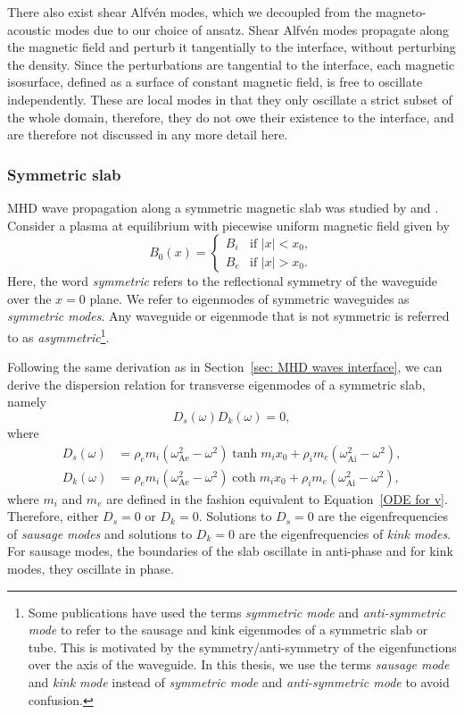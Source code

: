 There also exist shear Alfv\'{e}n modes, which we decoupled from the magneto-acoustic modes due to our choice of ansatz. Shear Alfv\'{e}n modes propagate along the magnetic field and perturb it tangentially to the interface, without perturbing the density. Since the perturbations are tangential to the interface, each magnetic isosurface, defined as a surface of constant magnetic field, is free to oscillate independently. These are local modes in that they only oscillate a strict subset of the whole domain, therefore, they do not owe their existence to the interface, and are therefore not discussed in any more detail here.


\subsubsection{Symmetric slab} \label{sec: MHD waves sym slab}

MHD wave propagation along a symmetric magnetic slab was studied by \cite{rob81b} and \cite{edw_etal82}. Consider a plasma at equilibrium  with piecewise uniform magnetic field given by
\begin{equation}
B_0(x) =
\begin{cases}
B_i & \text{if } |x| < x_0, \\
B_e & \text{if } |x| > x_0.
\end{cases}
\end{equation}
Here, the word \textit{symmetric} refers to the reflectional symmetry of the waveguide over the $x = 0$ plane. We refer to eigenmodes of symmetric waveguides as \textit{symmetric modes}. Any waveguide or eigenmode that is not symmetric is referred to as \textit{asymmetric}\footnote{Some publications have used the terms \textit{symmetric mode} and \textit{anti-symmetric mode} to refer to the sausage and kink eigenmodes of a symmetric slab or tube. This is motivated by the symmetry/anti-symmetry of the eigenfunctions over the axis of the waveguide. In this thesis, we use the terms \textit{sausage mode} and \textit{kink mode} instead of \textit{symmetric mode} and \textit{anti-symmetric mode} to avoid confusion.}.

Following the same derivation as in Section~\ref{sec: MHD waves interface}, we can derive the dispersion relation for transverse eigenmodes of a symmetric slab, namely
\begin{equation}
	D_s(\omega)D_k(\omega) = 0, \label{DR sym slab}
\end{equation}
where
\begin{align}
	D_s(\omega) &= \rho_em_i(\omega_\textrm{Ae}^2 - \omega^2)\tanh{m_ix_0} + \rho_im_e(\omega_\textrm{Ai}^2 - \omega^2), \\
	D_k(\omega) &= \rho_em_i(\omega_\textrm{Ae}^2 - \omega^2)\coth{m_ix_0} + \rho_im_e(\omega_\textrm{Ai}^2 - \omega^2),
\end{align}
where $m_i$ and $m_e$ are defined in the fashion equivalent to Equation~\eqref{ODE for v}. Therefore, either $D_s = 0$ or $D_k = 0$. Solutions to $D_s = 0$ are the eigenfrequencies of \textit{sausage modes} and solutions to $D_k = 0$ are the eigenfrequencies of \textit{kink modes}. For sausage modes, the boundaries of the slab oscillate in anti-phase and for kink modes, they oscillate in phase.

